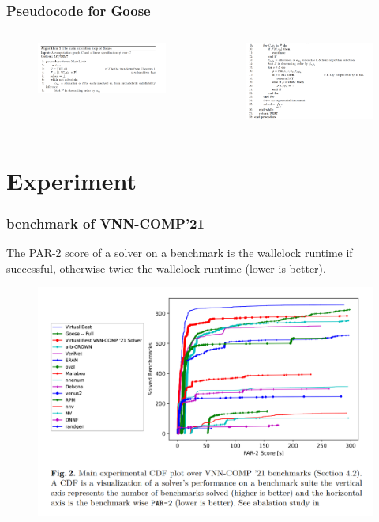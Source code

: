 \documentclass[aspectratio=169%
,serif,mathserif]{beamer}
\begin{document}
\begin{frame}
	\frametitle{Pseudocode for Goose}
	\begin{columns}
		\begin{column}{.5\textwidth}
			\begin{figure}[htbp]
				\includegraphics[width=1\linewidth]{3.png}
			\end{figure}
		\end{column}

		\begin{column}{.5\textwidth}
			\begin{figure}[htbp]
				\includegraphics[width=1\linewidth]{4.png}
			\end{figure}
		\end{column}
	\end{columns}
\end{frame}

\section{Experiment}
\begin{frame}
	\frametitle{benchmark of VNN-COMP'21}
	The PAR-2 score of a solver on a benchmark is the wallclock runtime if successful, otherwise twice the wallclock runtime (lower is better).
	\begin{figure}[htbp]
		\includegraphics[width=.5\linewidth]{5.png}
	\end{figure}
\end{frame}
\end{document}
